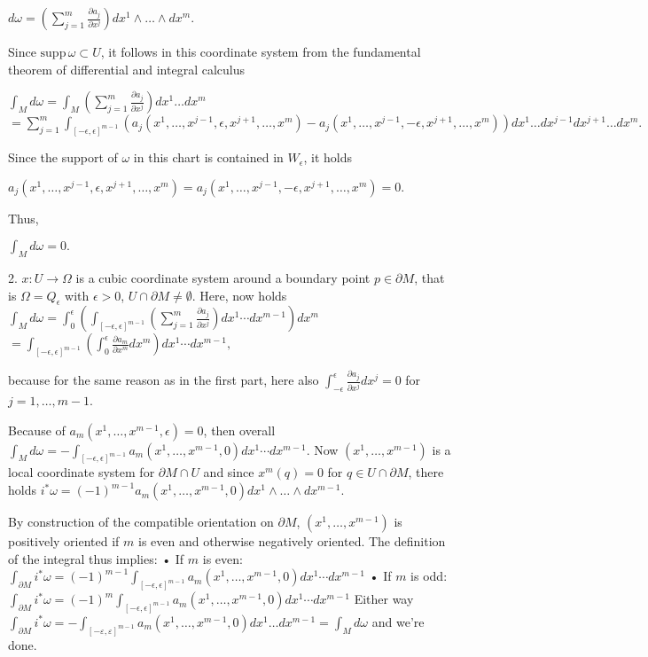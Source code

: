 \(d\omega = \left( \sum_{j=1}^m \frac{\partial a_j}{\partial x^j} \right) dx^1 \wedge \dots \wedge dx^m. \)

Since \(\text{supp} \, \omega \subset U\), it follows in this coordinate system from the fundamental theorem of differential and integral calculus

\(\int_M d\omega = \int_M \left( \sum_{j=1}^m \frac{\partial a_j}{\partial x^j} \right) dx^1 \dots dx^m \)
\(= \sum_{j=1}^m \int_{[- \epsilon, \epsilon]^{m-1}} (a_j(x^1, \dots, x^{j-1}, \epsilon, x^{j+1}, \dots, x^m) - a_j(x^1, \dots, x^{j-1}, -\epsilon, x^{j+1}, \dots, x^m)) dx^1 \dots dx^{j-1} dx^{j+1} \dots dx^m. \)

Since the support of \(\omega\) in this chart is contained in \(W_\epsilon\), it holds

\(a_j(x^1, \dots, x^{j-1}, \epsilon, x^{j+1}, \dots, x^m) = a_j(x^1, \dots, x^{j-1}, -\epsilon, x^{j+1}, \dots, x^m) = 0.\)

Thus,

\(\int_M d\omega = 0.\)

2. 
\(x: U \to \Omega\) is a cubic coordinate system around a boundary point \(p \in \partial M\), 
that is \(\Omega = Q_\epsilon\) with \(\epsilon > 0\), \(U \cap \partial M \neq \emptyset\). 
Here, now holds
\(\int_{M} d\omega = \int_0^\epsilon \left( \int_{[-\epsilon, \epsilon]^{m-1}} \left( \sum_{j=1}^m \frac{\partial a_j}{\partial x^j} \right) dx^1 \dotsm dx^{m-1} \right) dx^m \)
\(= \int_{[-\epsilon, \epsilon]^{m-1}} \left( \int_0^\epsilon \frac{\partial a_m}{\partial x^m} dx^m \right) dx^1 \dotsm dx^{m-1}, \)

because for the same reason as in the first part, here also
\(\int_{-\epsilon}^\epsilon \frac{\partial a_j}{\partial x^j} dx^j = 0\)
for \(j = 1, \dots, m-1\).

Because of \(a_m(x^1, \dots, x^{m-1}, \epsilon) = 0\), then overall
\(\int_M d\omega = -\int_{[-\epsilon, \epsilon]^{m-1}} a_m(x^1, \dots, x^{m-1}, 0) dx^1 \dotsm dx^{m-1}.\)
Now \((x^1, \dots, x^{m-1})\) is a local coordinate system for \(\partial M \cap U\) and since \(x^m(q) = 0\) for \(q \in U \cap \partial M\), there holds
\(i^* \omega = (-1)^{m-1} a_m (x^1, \dots, x^{m-1}, 0) dx^1 \wedge \dots \wedge dx^{m-1}.\)

By construction of the compatible orientation on \(\partial M\), \((x^1, \dots, x^{m-1})\) is positively oriented 
if \(m\) is even and otherwise negatively oriented. 
The definition of the integral thus implies:
• If \(m\) is even:
\(\int_{\partial M} i^* \omega = (-1)^{m-1} \int_{[-\epsilon, \epsilon]^{m-1}} a_m(x^1, \dots, x^{m-1}, 0) dx^1 \dotsm dx^{m-1}\)
• If \(m\) is odd:
\(\int_{\partial M} i^* \omega = (-1)^{m} \int_{[-\epsilon, \epsilon]^{m-1}} a_m(x^1, \dots, x^{m-1}, 0) dx^1 \dotsm dx^{m-1}\)
Either way
\( \int_{\partial M} i^\ast \omega = - \int_{[-\varepsilon, \varepsilon]^{m-1}} a_m(x^1, \dots, x^{m-1}, 0) dx^1 \dots dx^{m-1} = \int_M d\omega \)
and we're done.

